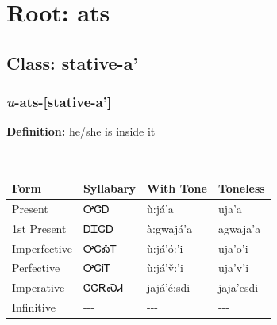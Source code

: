 \needspace{4in}
\section*{Root: ats}
\nopagebreak
{}
\needspace{3in}
\subsection*{Class: stative-a'}
\nopagebreak
\needspace{2in}
\subsubsection*{\textit{u}{-}\textbf{ats}{-}[stative-a']}
\nopagebreak
\textbf{Definition: } he/she is inside it
\\[0.5em]
\begin{tabularx}{\textwidth}{l X X X}%
\toprule%
\textbf{Form}&\textbf{Syllabary}&\textbf{With Tone}&\textbf{Toneless}\\%
\midrule%
Present&ᎤᏣᎠ&ù:já’a&uja’a\\%
1st Present&ᎠᏆᏣᎠ&à:gwajá’a&agwaja’a\\%
Imperfective&ᎤᏣᎣᎢ&ù:já’ó:’i&uja’o’i\\%
Perfective&ᎤᏣᎥᎢ&ù:já’v̌:’i&uja’v’i\\%
Imperative&ᏣᏣᎡᏍᏗ&jajá’é:sdi&jaja’esdi\\%
Infinitive&{-}{-}{-}&{-}{-}{-}&{-}{-}{-}\\%
\bottomrule%
\end{tabularx}
\\[1em]